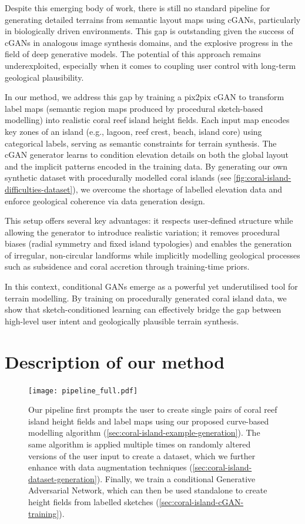 Despite this emerging body of work, there is still no standard pipeline for generating detailed terrains from semantic layout maps using cGANs, particularly in biologically driven environments. This gap is outstanding given the success of cGANs in analogous image synthesis domains, and the explosive progress in the field of deep generative models. The potential of this approach remains underexploited, especially when it comes to coupling user control with long-term geological plausibility.

\midConclusion

In our method, we address this gap by training a pix2pix cGAN to transform label maps (semantic region maps produced by procedural sketch-based modelling) into realistic coral reef island height fields. Each input map encodes key zones of an island (e.g., lagoon, reef crest, beach, island core) using categorical labels, serving as semantic constraints for terrain synthesis. The cGAN generator learns to condition elevation details on both the global layout and the implicit patterns encoded in the training data. By generating our own synthetic dataset with procedurally modelled coral islands (see \cref{fig:coral-island-difficulties-dataset}), we overcome the shortage of labelled elevation data and enforce geological coherence via data generation design.

This setup offers several key advantages: it respects user-defined structure while allowing the generator to introduce realistic variation; it removes procedural biases (radial symmetry and fixed island typologies) and enables the generation of irregular, non-circular landforms while implicitly modelling geological processes such as subsidence and coral accretion through training-time priors.

In this context, conditional GANs emerge as a powerful yet underutilised tool for terrain modelling. By training on procedurally generated coral island data, we show that sketch-conditioned learning can effectively bridge the gap between high-level user intent and geologically plausible terrain synthesis.




\section{Description of our method}
\label{sec:coral-island-method-description}

\begin{figure}[H]
    \texttt{[image: pipeline\_full.pdf]}
    \caption{Our pipeline first prompts the user to create single pairs of coral reef island height fields and label maps using our proposed curve-based modelling algorithm (\cref{sec:coral-island-example-generation}). The same algorithm is applied multiple times on randomly altered versions of the user input to create a dataset, which we further enhance with data augmentation techniques (\cref{sec:coral-island-dataset-generation}). Finally, we train a conditional Generative Adversarial Network, which can then be used standalone to create height fields from labelled sketches (\cref{sec:coral-island-cGAN-training}).}
    \label{fig:coral-island-pipeline}
\end{figure}


